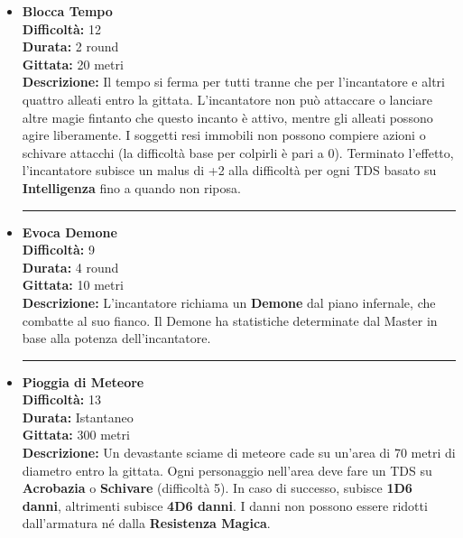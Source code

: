 \documentclass[./magie.tex]{subfiles}
\begin{document}
\begin{itemize}

\item \textbf{Blocca Tempo} \\
\textbf{Difficoltà:} 12 \\
\textbf{Durata:} 2 round \\
\textbf{Gittata:} 20 metri \\
\textbf{Descrizione:} Il tempo si ferma per tutti tranne che per l'incantatore e altri quattro alleati entro la gittata. L'incantatore non può attaccare o lanciare altre magie fintanto che questo incanto è attivo, mentre gli alleati possono agire liberamente. I soggetti resi immobili non possono compiere azioni o schivare attacchi (la difficoltà base per colpirli è pari a 0). Terminato l'effetto, l'incantatore subisce un malus di +2 alla difficoltà per ogni TDS basato su \textbf{Intelligenza} fino a quando non riposa.

\vspace{0.2cm}
\noindent
\begin{center}
\rule{\textwidth}{0.4pt} 
\end{center}
\vspace{0.2cm}

\item \textbf{Evoca Demone} \\
\textbf{Difficoltà:} 9 \\
\textbf{Durata:} 4 round \\
\textbf{Gittata:} 10 metri \\
\textbf{Descrizione:} L'incantatore richiama un \textbf{Demone} dal piano infernale, che combatte al suo fianco. Il Demone ha statistiche determinate dal Master in base alla potenza dell'incantatore.

\vspace{0.2cm}
\noindent
\begin{center}
\rule{\textwidth}{0.4pt} 
\end{center}
\vspace{0.2cm}

\item \textbf{Pioggia di Meteore} \\
\textbf{Difficoltà:} 13 \\
\textbf{Durata:} Istantaneo \\
\textbf{Gittata:} 300 metri \\
\textbf{Descrizione:} Un devastante sciame di meteore cade su un'area di 70 metri di diametro entro la gittata. Ogni personaggio nell'area deve fare un TDS su \textbf{Acrobazia} o \textbf{Schivare} (difficoltà 5). In caso di successo, subisce \textbf{1D6 danni}, altrimenti subisce \textbf{4D6 danni}. I danni non possono essere ridotti dall'armatura né dalla \textbf{Resistenza Magica}.


\end{itemize}
\end{document}
